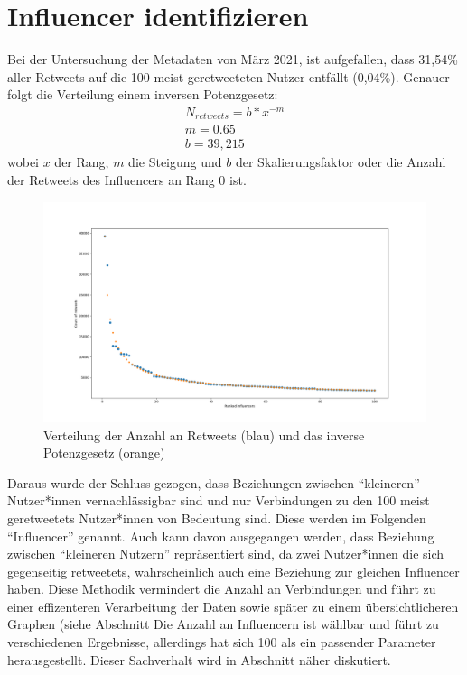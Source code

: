 \section{Influencer identifizieren}
\label{sec:influencer}
Bei der Untersuchung der Metadaten von März 2021, ist aufgefallen, dass 31,54\% aller \glspl{Retweet} auf die 100 meist geretweeteten Nutzer entfällt (0,04\%).
Genauer folgt die Verteilung einem inversen Potenzgesetz:
\begin{equation}
	\begin{aligned}
		N_{retweets} = b*x^{-m}\\
		m = 0.65\\
		b = 39,215
	\end{aligned}
\end{equation}
wobei $x$ der Rang, $m$ die Steigung und $b$ der Skalierungsfaktor oder die Anzahl der Retweets des Influencers an Rang 0 ist.\\
\begin{figure}[h!]
	\centering
	\includegraphics[width=0.8\linewidth]{images/power-law}
	\caption[]{Verteilung der Anzahl an \glspl{Retweet} (blau) und das inverse Potenzgesetz (orange)}
	\label{fig:tweetverteilung}
\end{figure}
Daraus wurde der Schluss gezogen, dass Beziehungen zwischen "`kleineren"' Nutzer*innen vernachlässigbar sind und nur Verbindungen zu den 100 meist \glspl{geretweetet} Nutzer*innen von Bedeutung sind. Diese werden im Folgenden "`Influencer"' genannt. Auch kann davon ausgegangen werden, dass Beziehung zwischen "`kleineren Nutzern"'  repräsentiert sind, da zwei Nutzer*innen die sich gegenseitig \glspl{retweetet}, wahrscheinlich auch eine Beziehung zur gleichen Influencer haben. 
Diese Methodik vermindert die Anzahl an Verbindungen und führt zu einer effizenteren Verarbeitung der Daten sowie später zu einem übersichtlicheren Graphen (siehe Abschnitt %
Die Anzahl an Influencern ist wählbar und führt zu verschiedenen Ergebnisse, allerdings hat sich 100 als ein passender Parameter herausgestellt. Dieser Sachverhalt wird in Abschnitt näher diskutiert.

